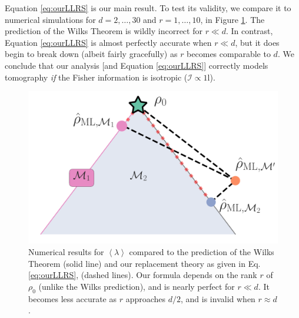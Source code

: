 \documentclass[aps,pra, twocolumn]{revtex4}
\newcommand{\expect}[1]{\ensuremath{\left\langle#1\right\rangle}}
\def\Id{1\!\mathrm{l}}
\newcommand{\Fi}{\mathcal{I}}
\begin{document}
Equation \eqref{eq:ourLLRS} is our main result.  To test its validity, we compare it to numerical simulations for $d=2,\ldots,30$ and $r=1,\ldots,10$, in Figure \ref{fig:modelcomp-iso}.  The prediction of the Wilks Theorem is wildly incorrect for $r\ll d$. In contrast, Equation \ref{eq:ourLLRS} is almost perfectly accurate when $r \ll d$, but it does begin to break down (albeit fairly gracefully) as $r$ becomes comparable to $d$.  We conclude that our analysis [and Equation \eqref{eq:ourLLRS}] correctly models tomography \emph{if} the Fisher information is isotropic ($\Fi \propto \Id$).

\begin{figure}[h]
 \includegraphics[width=\columnwidth]{Images/Figure_3.pdf}
 \caption{Numerical results for $\expect{\lambda}$ compared to the prediction of the Wilks Theorem (solid line) and our replacement theory as given in Eq. \ref{eq:ourLLRS}, (dashed lines).  Our formula depends on the rank $r$ of $\rho_0$ (unlike the Wilks prediction), and is nearly perfect for $r\ll d$.  It becomes less accurate as $r$ approaches $d/2$, and is invalid when $r\approx d$.}
 \label{fig:modelcomp-iso}
\end{figure}
\end{document}
